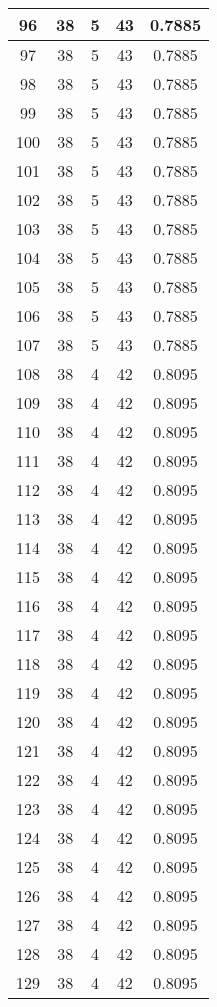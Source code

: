 \documentclass[letterpaper, 12pt]{article}
\begin{document}
\begin{longtable}{|c|c|c|c|c|}
\hline
96 & 38 & 5 & 43 & 0.7885 \\
\hline
97 & 38 & 5 & 43 & 0.7885 \\
\hline
98 & 38 & 5 & 43 & 0.7885 \\
\hline
99 & 38 & 5 & 43 & 0.7885 \\
\hline
100 & 38 & 5 & 43 & 0.7885 \\
\hline
101 & 38 & 5 & 43 & 0.7885 \\
\hline
102 & 38 & 5 & 43 & 0.7885 \\
\hline
103 & 38 & 5 & 43 & 0.7885 \\
\hline
104 & 38 & 5 & 43 & 0.7885 \\
\hline
105 & 38 & 5 & 43 & 0.7885 \\
\hline
106 & 38 & 5 & 43 & 0.7885 \\
\hline
107 & 38 & 5 & 43 & 0.7885 \\
\hline
108 & 38 & 4 & 42 & 0.8095 \\
\hline
109 & 38 & 4 & 42 & 0.8095 \\
\hline
110 & 38 & 4 & 42 & 0.8095 \\
\hline
111 & 38 & 4 & 42 & 0.8095 \\
\hline
112 & 38 & 4 & 42 & 0.8095 \\
\hline
113 & 38 & 4 & 42 & 0.8095 \\
\hline
114 & 38 & 4 & 42 & 0.8095 \\
\hline
115 & 38 & 4 & 42 & 0.8095 \\
\hline
116 & 38 & 4 & 42 & 0.8095 \\
\hline
117 & 38 & 4 & 42 & 0.8095 \\
\hline
118 & 38 & 4 & 42 & 0.8095 \\
\hline
119 & 38 & 4 & 42 & 0.8095 \\
\hline
120 & 38 & 4 & 42 & 0.8095 \\
\hline
121 & 38 & 4 & 42 & 0.8095 \\
\hline
122 & 38 & 4 & 42 & 0.8095 \\
\hline
123 & 38 & 4 & 42 & 0.8095 \\
\hline
124 & 38 & 4 & 42 & 0.8095 \\
\hline
125 & 38 & 4 & 42 & 0.8095 \\
\hline
126 & 38 & 4 & 42 & 0.8095 \\
\hline
127 & 38 & 4 & 42 & 0.8095 \\
\hline
128 & 38 & 4 & 42 & 0.8095 \\
\hline
129 & 38 & 4 & 42 & 0.8095 \\

\end{longtable}
\end{document}
